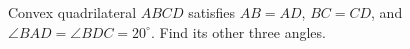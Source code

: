 Convex quadrilateral $ABCD$ satisfies $AB=AD$, $BC=CD$, and $\angle BAD=\angle BDC=20^\circ$. Find its other three angles.
